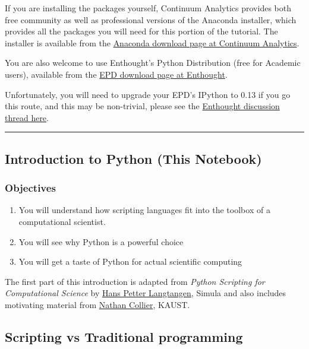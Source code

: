 \documentclass{article}
\begin{document}
If you are installing the packages yourself, Continuum Analytics
provides both free community as well as professional versions of the
Anaconda installer, which provides all the packages you will need for
this portion of the tutorial. The installer is available from the
\href{https://store.continuum.io/cshop/anaconda}{Anaconda download page
at Continuum Analytics}.

You are also welcome to use Enthought's Python Distribution (free for
Academic users), available from the
\href{http://www.enthought.com/products/epd.php}{EPD download page at
Enthought}.

Unfortunately, you will need to upgrade your EPD's IPython to 0.13 if
you go this route, and this may be non-trivial, please see the
\href{https://mail.enthought.com/pipermail/epd-users/2012-August/000800.html}{Enthought
discussion thread here}.

    \begin{center}\rule{3in}{0.4pt}\end{center}

\subsection{Introduction to Python (This
Notebook)}\label{introduction-to-python-this-notebook}

\subsubsection{Objectives}\label{objectives}

\begin{enumerate}
\def\labelenumi{\arabic{enumi}.}
\itemsep1pt\parskip0pt
\item
  You will understand how scripting languages fit into the toolbox of a
  computational scientist.
\item
  You will see why Python is a powerful choice
\item
  You will get a taste of Python for actual scientific computing
\end{enumerate}

The first part of this introduction is adapted from \emph{Python
Scripting for Computational Science} by
\href{http://folk.uio.no/hpl/}{Hans Petter Langtangen}, Simula and also
includes motivating material from
\href{http://www.mendeley.com/profiles/nathan-collier/}{Nathan Collier},
KAUST.

 

    \subsection{Scripting vs Traditional
programming}\label{scripting-vs-traditional-programming}
\end{document}
